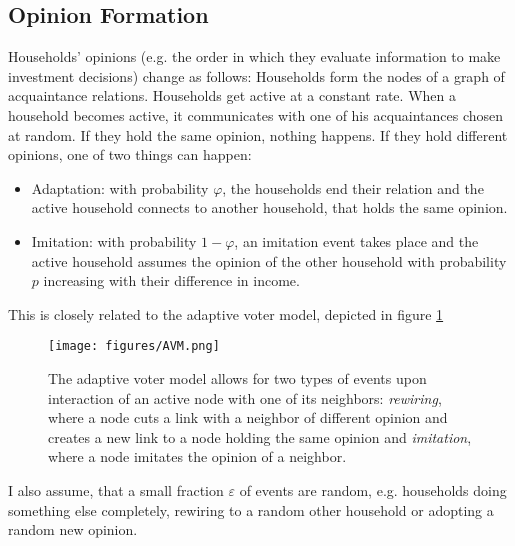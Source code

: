 \subsection{Opinion Formation}

Households' opinions (e.g. the order in which they evaluate information to make investment decisions) change as follows: Households form the nodes of a graph of acquaintance relations. Households get active at a constant rate. When a household becomes active, it communicates with one of his acquaintances chosen at random. If they hold the same opinion, nothing happens. If they hold different opinions, one of two things can happen:
\begin{itemize}
	\item Adaptation: with probability $\varphi$, the households end their relation and the active household connects to another household, that holds the same opinion. 
	\item Imitation: with probability $1-\varphi$, an imitation event takes place and the active household assumes the opinion of the other household with probability $p$ increasing with their difference in income.
\end{itemize}
This is closely related to the adaptive voter model, depicted in figure \ref{fig:adaptive_voter_model}

\begin{figure}[h]
	\centering
	\texttt{[image: figures/AVM.png]}
	\caption{The adaptive voter model allows for two types of events upon interaction of an active node with one of its neighbors: \textit{rewiring}, where a node cuts a link with a neighbor of different opinion and creates a new link to a node holding the same opinion and \textit{imitation}, where a node imitates the opinion of a neighbor.}
	\label{fig:adaptive_voter_model}
\end{figure}

I also assume, that a small fraction $\varepsilon$ of events are random, e.g. households doing something else completely, rewiring to a random other household or adopting a random new opinion.

